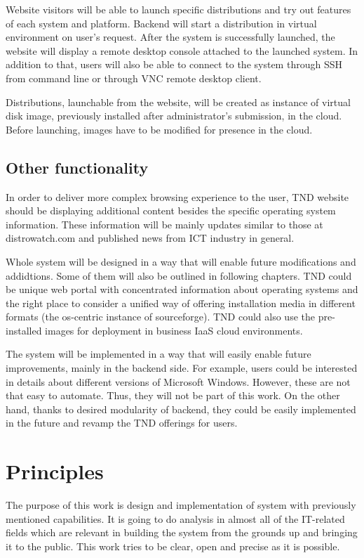 \documentclass[thesis=B,english]{FITthesis}[2013/04/26]
\begin{document}
Website visitors will be able to launch specific distributions and try out features of each system and platform. Backend will start a distribution in virtual environment on user's request. After the system is successfully launched, the website will display a remote desktop console attached to the launched system. In addition to that, users will also be able to connect to the system through SSH from command line or through VNC remote desktop client.

Distributions, launchable from the website, will be created as instance of virtual disk image, previously installed after administrator's submission, in the cloud. Before launching, images have to be modified for presence in the cloud.

\subsection{Other functionality}
\label{section:other_functionality}
In order to deliver more complex browsing experience to the user, TND website should be displaying additional content besides the specific operating system information. These information will be mainly updates similar to those at distrowatch.com and published news from ICT industry in general.

Whole system will be designed in a way that will enable future modifications and addidtions. Some of them will also be outlined in following chapters. TND could be unique web portal with concentrated information about operating systems and the right place to consider a unified way of offering installation media in different formats (the os-centric instance of sourceforge). TND could also use the pre-installed images for deployment in business IaaS cloud environments.

The system will be implemented in a way that will easily enable future improvements, mainly in the backend side. For example, users could be interested in details about different versions of Microsoft Windows. However, these are not that easy to automate. Thus, they will not be part of this work. On the other hand, thanks to desired modularity of backend, they could be easily implemented in the future and revamp the TND offerings for users.

\section{Principles}
\label{section:principles}
The purpose of this work is design and implementation of system with previously mentioned capabilities. It is going to do analysis in almost all of the IT-related fields which are relevant in building the system from the grounds up and bringing it to the public. This work tries to be clear, open and precise as it is possible.
\end{document}
